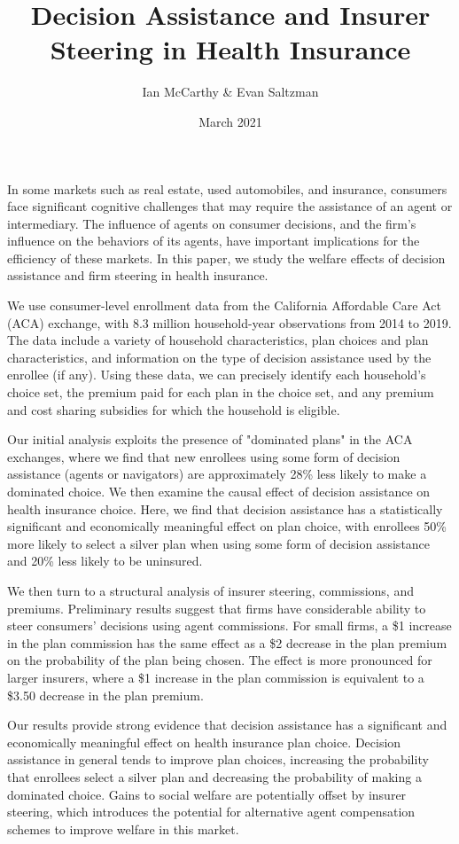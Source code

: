 \documentclass[12pt]{article}
\title{Decision Assistance and Insurer Steering in Health Insurance}
\author{Ian McCarthy \& Evan Saltzman}
\date{March 2021}
\begin{document}
\maketitle

In some markets such as real estate, used automobiles, and insurance, consumers face significant cognitive challenges that may require the assistance of an agent or intermediary. The influence of agents on consumer decisions, and the firm's influence on the behaviors of its agents, have important implications for the efficiency of these markets. In this paper, we study the welfare effects of decision assistance and firm steering in health insurance. 

We use consumer-level enrollment data from the California Affordable Care Act (ACA) exchange, with 8.3 million household-year observations from 2014 to 2019. The data include a variety of household characteristics, plan choices and plan characteristics, and information on the type of decision assistance used by the enrollee (if any). Using these data, we can precisely identify each household's choice set, the premium paid for each plan in the choice set, and any premium and cost sharing subsidies for which the household is eligible.

Our initial analysis exploits the presence of "dominated plans" in the ACA exchanges, where we find that new enrollees using some form of decision assistance (agents or navigators) are approximately 28\% less likely to make a dominated choice. We then examine the causal effect of decision assistance on health insurance choice. Here, we find that decision assistance has a statistically significant and economically meaningful effect on plan choice, with enrollees 50\% more likely to select a silver plan when using some form of decision assistance and 20\% less likely to be uninsured.

We then turn to a structural analysis of insurer steering, commissions, and premiums. Preliminary results suggest that firms have considerable ability to steer consumers' decisions using agent commissions. For small firms, a \$1 increase in the plan commission has the same effect as a \$2 decrease in the plan premium on the probability of the plan being chosen. The effect is more pronounced for larger insurers, where a \$1 increase in the plan commission is equivalent to a \$3.50 decrease in the plan premium. 

Our results provide strong evidence that decision assistance has a significant and economically meaningful effect on health insurance plan choice. Decision assistance in general tends to improve plan choices, increasing the probability that enrollees select a silver plan and decreasing the probability of making a dominated choice. Gains to social welfare are potentially offset by insurer steering, which introduces the potential for alternative agent compensation schemes to improve welfare in this market.
\end{document}

